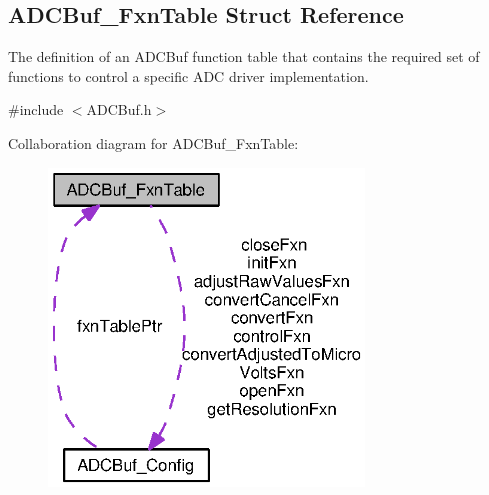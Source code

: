 \subsection{A\+D\+C\+Buf\+\_\+\+Fxn\+Table Struct Reference}
\label{struct_a_d_c_buf___fxn_table}


The definition of an A\+D\+C\+Buf function table that contains the required set of functions to control a specific A\+D\+C driver implementation.  




{\ttfamily \#include $<$A\+D\+C\+Buf.\+h$>$}



Collaboration diagram for A\+D\+C\+Buf\+\_\+\+Fxn\+Table\+:
\nopagebreak
\begin{figure}[H]
\begin{center}
\leavevmode
\includegraphics[width=238pt]{struct_a_d_c_buf___fxn_table__coll__graph}
\end{center}
\end{figure}
